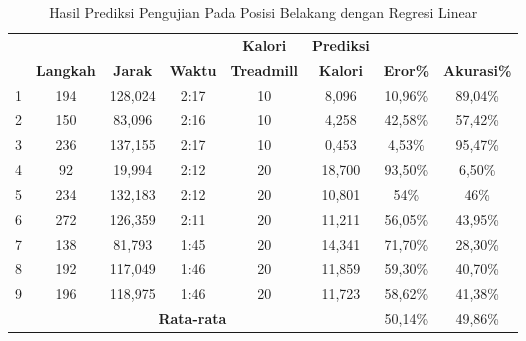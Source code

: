 \begin{longtable}{|c|c|c|c|c|c|c|c|}
  \caption{Hasil Prediksi Pengujian Pada Posisi Belakang dengan Regresi Linear}
  \label{tb:PengujianPosisiBelakangAnalisaPrediksiRegresi}                                   \\
  \hline
  \rowcolor[HTML]{C0C0C0}
  & & & & \textbf{Kalori} & \textbf{Prediksi} & & \\
  \rowcolor[HTML]{C0C0C0}
  \multirow{-2}{*}{\textbf{Percobaan}} & \multirow{-2}{*}{\textbf{Langkah}} & \multirow{-2}{*}{\textbf{Jarak}} & \multirow{-2}{*}{\textbf{Waktu}} & \textbf{Treadmill} & \textbf{Kalori} & \multirow{-2}{*}{\textbf{Eror\%}} & \multirow{-2}{*}{\textbf{Akurasi\%}} \\
  
  \hline
  1   & 194   & 128,024    & 2:17    & 10    & 8,096     & 10,96\%      & 89,04\%   \\
  \hline  
  2   & 150   & 83,096     & 2:16    & 10    & 4,258     & 42,58\%      & 57,42\%  \\
  \hline
  3   & 236   & 137,155    & 2:17    & 10    & 0,453     & 4,53\%       & 95,47\%   \\
  \hline
  4   & 92    & 19,994     & 2:12    & 20    & 18,700    & 93,50\%      & 6,50\%  \\
  \hline
  5   & 234   & 132,183    & 2:12    & 20    & 10,801    & 54\%         & 46\%    \\
  \hline
  6   & 272   & 126,359    & 2:11    & 20    & 11,211    & 56,05\%      & 43,95\%   \\
  \hline
  7   & 138   & 81,793     & 1:45    & 20    & 14,341    & 71,70\%      & 28,30\%   \\
  \hline
  8   & 192   & 117,049    & 1:46    & 20    & 11,859    & 59,30\%      & 40,70\%   \\
  \hline
  9   & 196   & 118,975    & 1:46    & 20    & 11,723    & 58,62\%      & 41,38\%   \\
  \hline

  \multicolumn{6}{|c|}{\textbf{Rata-rata}} & 50,14\% & 49,86\%  \\
  \hline
\end{longtable}

